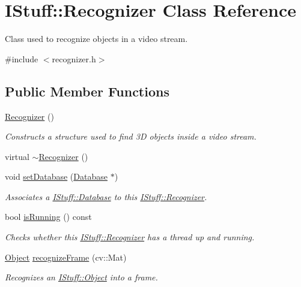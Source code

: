 \hypertarget{class_i_stuff_1_1_recognizer}{\section{I\-Stuff\-:\-:Recognizer Class Reference}
\label{class_i_stuff_1_1_recognizer}
}


Class used to recognize objects in a video stream.  




{\ttfamily \#include $<$recognizer.\-h$>$}

\subsection*{Public Member Functions}
\begin{DoxyCompactItemize}
\item 
\hyperlink{class_i_stuff_1_1_recognizer_a4bf77b760d8dbc50c4ef50cad433db40}{Recognizer} ()
\begin{DoxyCompactList}\small\item\em Constructs a structure used to find 3\-D objects inside a video stream. \end{DoxyCompactList}\item 
virtual \hyperlink{class_i_stuff_1_1_recognizer_aa0035e71951a13fe00764a54913d0e5a}{$\sim$\-Recognizer} ()
\item 
void \hyperlink{class_i_stuff_1_1_recognizer_a37fe89eb44d68215cab011b1962b8293}{set\-Database} (\hyperlink{class_i_stuff_1_1_database}{Database} $\ast$)
\begin{DoxyCompactList}\small\item\em Associates a \hyperlink{class_i_stuff_1_1_database}{I\-Stuff\-::\-Database} to this \hyperlink{class_i_stuff_1_1_recognizer}{I\-Stuff\-::\-Recognizer}. \end{DoxyCompactList}\item 
bool \hyperlink{class_i_stuff_1_1_recognizer_aac5297071c1f6ff12049a58c88bb3952}{is\-Running} () const 
\begin{DoxyCompactList}\small\item\em Checks whether this \hyperlink{class_i_stuff_1_1_recognizer}{I\-Stuff\-::\-Recognizer} has a thread up and running. \end{DoxyCompactList}\item 
\hyperlink{class_i_stuff_1_1_object}{Object} \hyperlink{class_i_stuff_1_1_recognizer_a6505a142d08eaf1e8f6a1f95571a4c7a}{recognize\-Frame} (cv\-::\-Mat)
\begin{DoxyCompactList}\small\item\em Recognizes an \hyperlink{class_i_stuff_1_1_object}{I\-Stuff\-::\-Object} into a frame. \end{DoxyCompactList}\item 

\end{DoxyCompactItemize}
